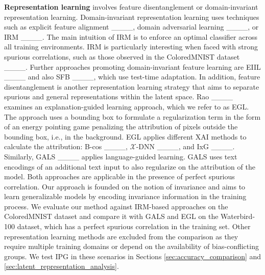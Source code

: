 \textbf{Representation learning} involves feature disentanglement or domain-invariant representation learning.
Domain-invariant representation learning uses techniques such as explicit feature alignment ____, domain adversarial learning ____, or \ac{IRM} ____. 
The main intuition of \ac{IRM} is to enforce an optimal classifier across all training environments.
IRM is particularly interesting when faced with strong spurious correlations, such as those observed in the ColoredMNIST dataset ____.
Further approaches promoting domain-invariant feature learning are EIIL ____ and also SFB ____, which use test-time adaptation.
In addition, feature disentanglement is another representation learning strategy that aims to separate spurious and general representations within the latent space.
%
Rao ____ examines an 
explanation-guided learning approach, which we refer to as EGL.
The approach uses a bounding box to formulate a regularization term in the form of an energy pointing game penalizing the attribution of pixels outside the bounding box, i.e., in the background.
EGL applies different \ac{XAI} methods to calculate the attribution: B-cos ____, $\mathcal{X}$-DNN ____, and IxG ____.
Similarly, GALS ____ applies language-guided learning.
GALS uses text encodings of an additional text input to also regularize on the attribution of the model.
Both approaches are applicable in the presence of perfect spurious correlation. 
%
Our approach is founded on the notion of invariance and aims to learn generalizable models by encoding invariance information in the training process.
We evaluate our method against IRM-based approaches on the ColoredMNIST dataset and compare it with GALS and EGL on the Waterbird-100 dataset, which has a perfect spurious correlation in the training set.
Other representation learning methods are excluded from the comparison as they require multiple training domains or depend on the availability of bias-conflicting groups.
%
We test IPG in these scenarios in Sections \ref{sec:accuracy_comparison} and \ref{sec:latent_representation_analysis}.

